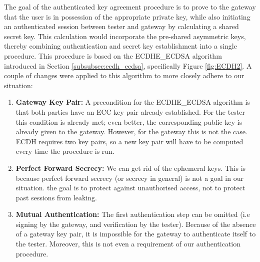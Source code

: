 The goal of the authenticated key agreement procedure is to prove to the gateway that the user is in possession of the appropriate private key, while also initiating an authenticated session between tester and gateway by calculating a shared secret key. This calculation would incorporate the pre-shared asymmetric keys, thereby combining authentication and secret key establishment into a single procedure. This procedure is based on the ECDHE\_ECDSA algorithm introduced in Section \ref{subsubsec:ecdh_ecdsa}, specifically Figure \ref{fig:ECDH2}. A couple of changes were applied to this algorithm to more closely adhere to our situation:
\begin{enumerate}
	\item \textbf{Gateway Key Pair:} A precondition for the ECDHE\_ECDSA algorithm is that both parties have an ECC key pair already established. For the tester this condition is already met; even better, the corresponding public key is already given to the gateway. However, for the gateway this is not the case. ECDH requires two key pairs, so a new key pair will have to be computed every time the procedure is run.
	
	\item \textbf{Perfect Forward Secrecy:} We can get rid of the ephemeral keys. This is because perfect forward secrecy (or secrecy in general) is not a goal in our situation. the goal is to protect against unauthorised access, not to protect past sessions from leaking. 
	
	\item \textbf{Mutual Authentication:} The first authentication step can be omitted (i.e signing by the gateway, and verification by the tester). Because of the absence of a gateway key pair, it is impossible for the gateway to authenticate itself to the tester. Moreover, this is not even a requirement of our authentication procedure.
\end{enumerate}
